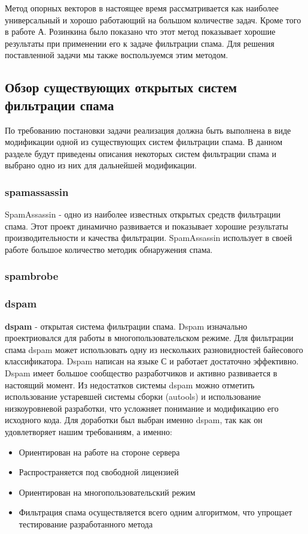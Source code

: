 Метод опорных векторов в настоящее время рассматривается как наиболее универсальный и хорошо работающий на большом количестве задач. Кроме того в работе А. Розинкина было показано что этот метод показывает хорошие результаты при применении его к задаче фильтрации спама. Для решения поставленной задачи мы также воспользуемся этим методом.

\subsection{Обзор существующих открытых систем фильтрации спама}
По требованию постановки задачи реализация должна быть выполнена в виде модификации одной из существующих систем фильтрации спама. В данном разделе будут приведены описания некоторых систем фильтрации спама и выбрано одно из них для дальнейшей модификации.
\subsubsection{spamassassin}
SpamAssassin - одно из наиболее известных открытых средств фильтрации спама. Этот проект динамично развивается и показывает хорошие результаты производительности и качества фильтрации. SpamAssassin использует в своей работе большое количество методик обнаружения спама.
\subsubsection{spambrobe}


\subsubsection{dspam}
\textbf{dspam} - открытая система фильтрации спама. Dspam изначально проектриовался для работы в многопользовательском режиме.
Для фильтрации спама dspam может использовать одну из нескольких разновидностей байесового классификатора.
Dspam написан на языке С и работает достаточно эффективно. Dspam имеет большое сообщество разработчиков и активно развивается в настоящий момент.
Из недостатков системы dspam можно отметить использование устаревшей системы сборки (autools) и использование низкоуровневой разработки, что усложняет понимание и модификацию его исходного кода.
Для доработки был выбран именно dspam, так как он удовлетворяет нашим требованиям, а именно:
\begin{itemize}
\item Ориентирован на работе на стороне сервера
\item Распространяется под свободной лицензией
\item Ориентирован на многопользовательский режим
\item Фильтрация спама осуществляется  всего одним алгоритмом, что упрощает тестирование разработанного метода
\end{itemize}
